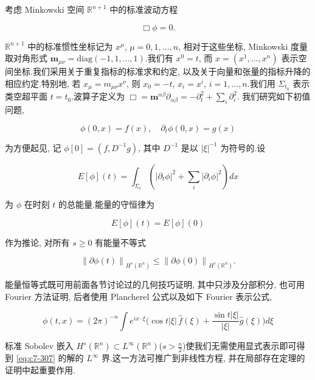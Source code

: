 考虑 Minkowski 空间 $\mathbb{R}^{n+1}$ 中的标准波动方程

\begin{equation}
\Box\phi = 0.\label{eq:c7-307}
\end{equation}

$\mathbb{R}^{n+1}$ 中的标准惯性坐标记为 $x^{\mu}$, $\mu = 0, 1, \ldots, n$, 相对于这些坐标, Minkowski 度量取对角形式 $\mathbf{m}_{\mu\nu} = \mathrm{diag}(-1, 1, \ldots, 1)$.我们有 $x^0 = t$, 而 $x = (x^1, \ldots, x^n)$ 表示空间坐标.我们采用关于重复指标的标准求和约定, 以及关于向量和张量的指标升降的相应约定.特别地, 若 $x_{\mu} = m_{\mu\nu}x^{\nu}$, 则 $x_0 = -t$, $x_i = x^i$, $i = 1, \ldots, n$.我们用 $\Sigma_{t_0}$ 表示类空超平面 $t = t_0$.波算子定义为
$\Box = \mathbf{m}^{\alpha\beta}\partial_{\alpha\beta} = -\partial_t^2 + \sum_i\partial_i^2$.
我们研究如下初值问题,

\begin{equation}
\phi(0, x) = f(x), \quad\partial_t\phi(0, x) = g(x)\label{eq:c7-308}
\end{equation}

为方便起见, 记 $\phi[0] = (f, D^{-1}g)$, 其中 $D^{-1}$ 是以 $|\xi|^{-1}$ 为符号的.设

\begin{equation}
E[\phi](t) = \int_{\Sigma_t}\left(|\partial_t\phi|^2 + \sum_i|\partial_i\phi|^2\right)dx\label{eq:c7-309}
\end{equation}

为 $\phi$ 在时刻 $t$ 的总能量.能量的守恒律为

\begin{equation}
E[\phi](t) = E[\phi](0)\label{eq:c7-310}
\end{equation}

作为推论, 对所有 $s\geq 0$ 有能量不等式

\[
\left\|\partial\phi(t)\right\|_{H^s(\mathbb{R}^n)} \leq \left\|\partial\phi(0)\right\|_{H^s(\mathbb{R}^n)}.
\]

能量恒等式既可用前面各节讨论过的几何技巧证明, 其中只涉及分部积分, 也可用 Fourier 方法证明, 后者使用 Plancherel 公式以及如下 Fourier 表示公式,

\begin{equation}
\phi(t, x) = (2\pi)^{-n}\int e^{ix\cdot\xi}\Big(\cos t|\xi|\, \hat{f}(\xi) + \frac{\sin t|\xi|}{|\xi|}\hat{g}(\xi)\Big)d\xi\label{eq:c7-311}
\end{equation}

\begin{remark}\label{rem:c7-0.23}
标准 Sobolev 嵌入 $H^s(\mathbb{R}^n)\subset L^{\infty}(\mathbb{R}^n)$($s > \frac{n}{2}$)使我们无需使用显式表示即可得到 \eqref{eq:c7-307} 的解的 $L^{\infty}$ 界.这一方法可推广到非线性方程, 并在局部存在定理的证明中起重要作用.
\end{remark}

